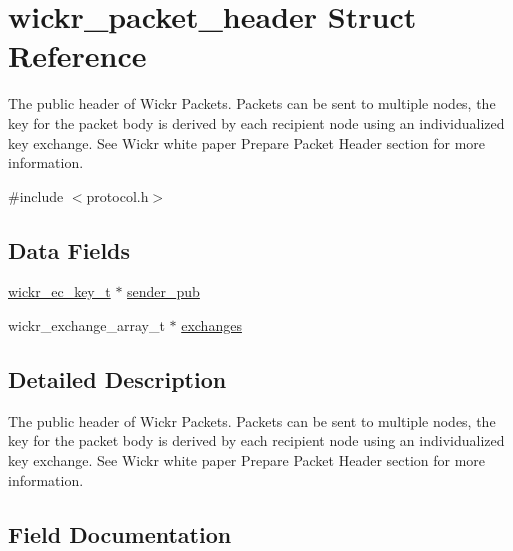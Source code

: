 \hypertarget{structwickr__packet__header}{}\section{wickr\+\_\+packet\+\_\+header Struct Reference}
\label{structwickr__packet__header}


The public header of Wickr Packets. Packets can be sent to multiple nodes, the key for the packet body is derived by each recipient node using an individualized key exchange. See Wickr white paper \textquotesingle{}Prepare Packet Header\textquotesingle{} section for more information.  




{\ttfamily \#include $<$protocol.\+h$>$}

\subsection*{Data Fields}
\begin{DoxyCompactItemize}
\item 
\hyperlink{structwickr__ec__key}{wickr\+\_\+ec\+\_\+key\+\_\+t} $\ast$ \hyperlink{structwickr__packet__header_aa32926d47dd2639030523593bfefc998}{sender\+\_\+pub}
\item 
wickr\+\_\+exchange\+\_\+array\+\_\+t $\ast$ \hyperlink{structwickr__packet__header_a49af3b4865a9deee0e60883134ebbb83}{exchanges}
\end{DoxyCompactItemize}


\subsection{Detailed Description}
The public header of Wickr Packets. Packets can be sent to multiple nodes, the key for the packet body is derived by each recipient node using an individualized key exchange. See Wickr white paper \textquotesingle{}Prepare Packet Header\textquotesingle{} section for more information. 

\subsection{Field Documentation}
\mbox{\label{structwickr__packet__header_a49af3b4865a9deee0e60883134ebbb83}} 
